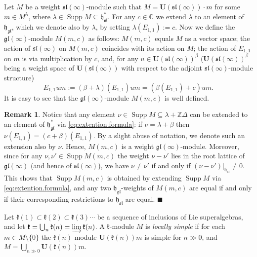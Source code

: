 \documentclass[12pt]{amsart}
\newcommand\C{\mathbb{C}}
\newcommand\Z{\mathbb{Z}}
\newcommand\fh{\mathfrak{h}}
\newcommand\fsl{\mathfrak{sl}}
\newcommand\fgl{\mathfrak{gl}}
\newcommand\fk{\mathfrak{k}}
\newcommand\D{\Delta}
\newcommand\bU{\mathbf{U}}
\DeclareMathOperator{\Supp}{Supp} %
\theoremstyle{plain}
\theoremstyle{definition}
\newtheorem{rem}[theo]{Remark}
\numberwithin{equation}{section}
\newcommand\xqed[1]{%
  \leavevmode\unskip\penalty9999 \hbox{}\nobreak\hfill
  \quad\hbox{#1}}
\newcommand\demo{\xqed{$\blacksquare$}}
\begin{document}
Let $M$ be a weight $\fsl(\infty)$-module such that $M=\bU(\fsl(\infty))\cdot m$ for some $m\in M^\lambda$, where $\lambda\in \Supp M\subseteq \fh_\fsl^*$. For any $c\in \C$ we extend $\lambda$ to an element of $\fh_{\fgl}$, which we denote also by $\lambda$, by setting $\lambda(E_{1,1}):=c$. Now we define the $\fgl(\infty)$-module $M(m,c)$ as follows: $M(m,c)$ equals $M$ as a vector space; the action of $\fsl(\infty)$ on $M(m,c)$ coincides with its action on $M$; the action of $E_{1,1}$ on $m$ is via multiplication by $c$, and, for any $u\in \bU(\fsl(\infty))^\beta$ ($\bU(\fsl(\infty))^\beta$ being a weight space of $\bU(\fsl(\infty))$ with respect to the adjoint $\fsl(\infty)$-module structure)
\begin{equation}\label{eq:extention.formula}
E_{1,1}um := (\beta+\lambda)(E_{1,1}) um = (\beta(E_{1,1})+c) um.
\end{equation}
It is easy to see that the $\mathfrak{gl}(\infty)$-module $M(m,c)$ is well defined. %

\begin{rem}\label{rem:weights.of.M(m,c)}
Notice that any element $\nu\in \Supp M \subseteq \lambda + \Z\D$ can be extended to an element of $\fh_\fgl^*$ via \eqref{eq:extention.formula}: if $\nu = \lambda+\beta$ then $\nu(E_{1,1}) = (c + \beta)(E_{1,1})$. By a slight abuse of notation, we denote such an extension also by $\nu$. Hence, $M(m,c)$ is a weight $\fgl(\infty)$-module. Moreover, since for any $\nu, \nu'\in \Supp M(m,c)$ the weight $\nu-\nu'$ lies in the root lattice of $\fgl(\infty)$ (and hence of $\fsl(\infty)$), we have $\nu\neq \nu'$ if and only if $(\nu-\nu')|_{\fh_\fsl}\neq 0$. This shows that $\Supp M(m,c)$ is obtained by extending $\Supp M$ via \eqref{eq:extention.formula}, and any two $\fh_\fgl$-weights of $M(m,c)$ are equal if and only if their corresponding restrictions to $\fh_\fsl$ are equal.
\demo
\end{rem}

Let $\fk(1)\subset \fk(2)\subset \fk(3)\cdots$ be a sequence of inclusions of Lie superalgebras, and let $\fk = \bigcup_n \fk(n)=\varinjlim \fk(n)$. A $\fk$-module $M$ is \emph{locally simple} if for each $m\in M\setminus\{0\}$ the $\fk(n)$-module $\bU(\fk(n))m$ is simple for $n\gg 0$, and $M = \bigcup_{n\gg 0} \bU(\fk(n))m$.
\end{document}
